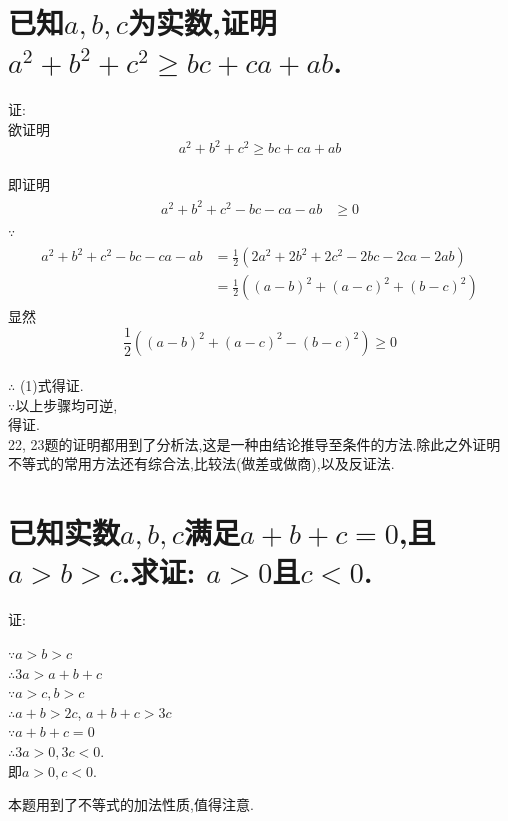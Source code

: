\documentclass[oneside]{book}
\newcommand{\1}{\underline{\makebox[1cm]{}}}
\newcommand{\2}{\underline{\makebox[2cm]{}}}
\newcommand{\3}{\underline{\makebox[3cm]{}}}
\newcommand{\4}{\underline{\makebox[4cm]{}}}
\newcommand{\blk}{\vspace*{1\baselineskip} }
\newlength{\la}
\begin{document}
        \section{已知$a,b,c$为实数,证明$a^2+b^2+c^2 \geq bc+ca+ab$.}
        {\large
        证:
        \\
        欲证明$$a^2+b^2+c^2 \geq bc+ca+ab$$\\
        即证明
        \begin{align}
            \begin{aligned}
               a^2+b^2+c^2 - bc-ca-ab &\geq 0 
            \end{aligned}
        \end{align}
        $\because$
        \begin{align}
            \begin{aligned}
                a^2+b^2+c^2 - bc-ca-ab &= \frac{1}{2}(2a^2+2b^2+2c^2 - 2bc-2ca-2ab)
                \nonumber\\
                &= \frac{1}{2}((a-b)^2+(a-c)^2+(b-c)^2)
            \end{aligned}
        \end{align}
        显然$$\frac{1}{2}((a-b)^2+(a-c)^2-(b-c)^2) \geq 0$$\\
        $\therefore$ (1)式得证.\\
        $\because$以上步骤均可逆,\\
        得证.\\
        
        \rightline{$\blacksquare$}
        }
        \blk
        \Large 22, 23题的证明都用到了分析法,这是一种由结论推导至条件的方法.除此之外证明不等式的常用方法还有综合法,比较法(做差或做商),以及反证法.
    
        \section{已知实数$a,b,c$满足$a+b+c=0$,且$a>b>c$.求证: $a>0$且$c<0$.}
        {\large
        证:
        \begin{center}
            $\because a>b>c$\\
            $\therefore 3a>a+b+c$\\
            $\because a>c,b>c$\\
            $\therefore a+b>2c$,
            $a+b+c>3c$\\
            $\because a+b+c=0$\\
            $\therefore 3a>0, 3c<0$.\\
            即$a>0, c<0$.
        \end{center}
        }
        \rightline{$\blacksquare$}
        \Large 本题用到了不等式的加法性质,值得注意.
        \blk
\end{document}
